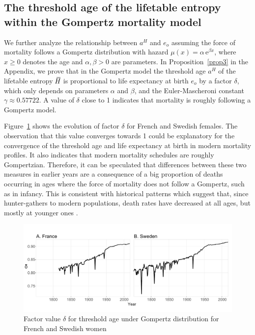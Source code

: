 \documentclass[a4paper,twoside, openright, 12pt, leqno]{article}
\newcommand*\xbar[1]{%
   \hbox{%
     \vbox{%
       \hrule height 0.5pt %
       \kern0.3ex%
       \hbox{%
         \kern-0.28em%
         \ensuremath{#1}%
         \kern-0.05em%
       }%
     }%
   }%
}
\begin{document}
\FloatBarrier

\subsection{The threshold age of the lifetable entropy within the Gompertz mortality model}

We further analyze the relationship between $a^H$ and $e_o$ assuming the force of mortality follows a Gompertz distribution with hazard $\mu(x)=\alpha\,\mathrm{e}^{\beta x}$, where $x\geq0$ denotes the age and $\alpha,\beta>0$ are parameters. In Proposition~\ref{prop3} in the Appendix, we prove that in the Gompertz model the threshold age $a^H$ of the lifetable entropy $\,\xbar{H}$ is proportional to life expectancy at birth $e_o$ by a factor $\delta$, which only depends on parameters $\alpha$ and $\beta$, and the Euler-Mascheroni constant $\gamma\approx 0.57722$. A value of $\delta$ close to 1 indicates that mortality is roughly following a Gompertz model. 

Figure~\ref{Fig:delta} shows the evolution of factor $\delta$ for French and Swedish females. The observation that this value converges towards 1 could be explanatory for the convergence of the threshold age and life expectancy at birth in modern mortality profiles. It also indicates that modern mortality schedules are roughly Gompertzian. Therefore, it can be speculated that differences between these two measures in earlier years are a consequence of a big proportion of deaths occurring in ages where the force of mortality does not follow a Gompertz, such as in infancy. This is consistent with historical patterns which suggest that, since hunter-gathers to modern populations, death rates have decreased at all ages, but mostly at younger ones \citep{burger2012human}. 
%
\begin{figure}[h!]
	\centering
	\includegraphics[width=.95\textwidth]{Figures/Figure_delta}
	\caption{Factor value $\delta$ for threshold age under Gompertz distribution for French and Swedish women}
	\label{Fig:delta}
\end{figure}
\end{document}
